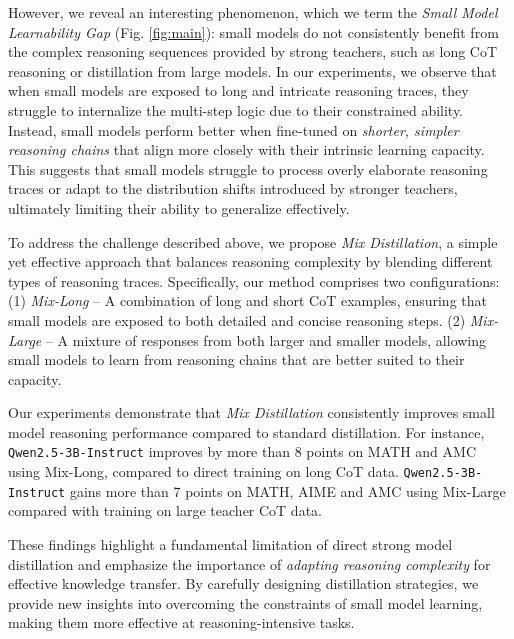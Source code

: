 However, we reveal an interesting phenomenon, which we term the \textit{Small Model Learnability Gap} (Fig. \ref{fig:main}): small models do not consistently benefit from the complex reasoning sequences provided by strong teachers, such as long CoT reasoning or distillation from large models. In our experiments, we observe that when small models are exposed to long and intricate reasoning traces, they struggle to internalize the multi-step logic due to their constrained ability. Instead, small models perform better when fine-tuned on \textit{shorter, simpler reasoning chains} that align more closely with their intrinsic learning capacity. This suggests that small models struggle to process overly elaborate reasoning traces or adapt to the distribution shifts introduced by stronger teachers, ultimately limiting their ability to generalize effectively.




To address the challenge described above, we propose \textit{Mix Distillation}, a simple yet effective approach that balances reasoning complexity by blending different types of reasoning traces. Specifically, our method comprises two configurations: (1) \textit{Mix-Long} – A combination of long and short CoT examples, ensuring that small models are exposed to both detailed and concise reasoning steps. (2) \textit{Mix-Large} – A mixture of responses from both larger and smaller models, allowing small models to learn from reasoning chains that are better suited to their capacity.  

Our experiments demonstrate that \textit{Mix Distillation} consistently improves small model reasoning performance compared to standard distillation. 
For instance, \texttt{Qwen2.5-3B-Instruct} improves by more than 8 points on MATH and AMC using Mix-Long, compared to direct training on long CoT data.
\texttt{Qwen2.5-3B-Instruct} gains more than 7 points on MATH, AIME and AMC using Mix-Large compared with training on large teacher CoT data.

These findings highlight a fundamental limitation of direct strong model distillation and emphasize the importance of \textit{adapting reasoning complexity} for effective knowledge transfer. By carefully designing distillation strategies, we provide new insights into overcoming the constraints of small model learning, making them more effective at reasoning-intensive tasks.  


